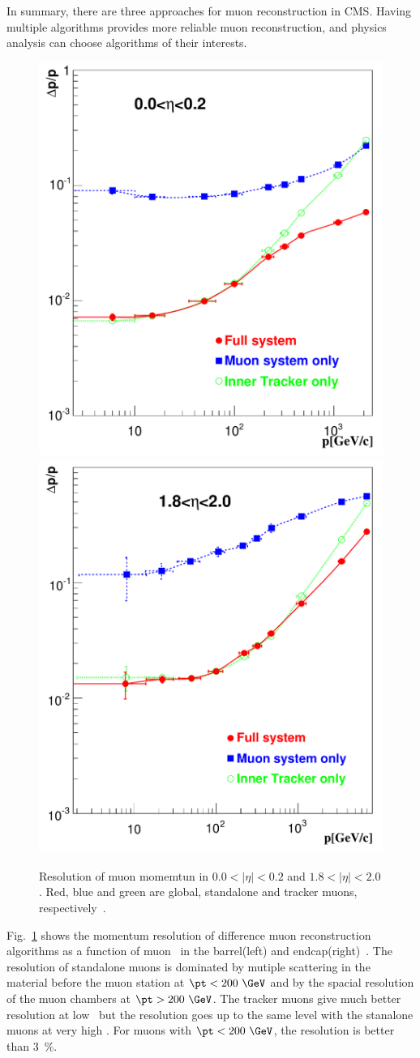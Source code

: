 In summary, there are three approaches for muon reconstruction in CMS. 
Having multiple algorithms provides more reliable muon reconstruction, 
and physics analysis can choose algorithms of their interests. 
\begin{figure}[!hbtp]
\centering
\includegraphics[width=.45\textwidth]{figures/Figure_001-005-a.pdf}
\includegraphics[width=.45\textwidth]{figures/Figure_001-005-b.pdf}
\caption{Resolution of muon momemtun in $0.0<|\eta|<0.2$ and $1.8<|\eta|<2.0$. 
Red, blue and green are global, standalone and tracker muons, 
respectively~\cite{cmstdr1}.} 
\label{fig:muon_res}
\end{figure}
Fig.~\ref{fig:muon_res} shows the momentum resolution of difference muon 
reconstruction algorithms as a function of muon \pt\ 
in the barrel(left) and endcap(right)~\cite{cmstdr1}. 
The resolution of standalone muons is dominated by mutiple scattering in the material 
before the muon station at $\pt<200~\GeV$  and by the spacial resolution 
of the muon chambers at $\pt>200~\GeV$. The tracker muons give much better 
resolution at low \pt\, but the resolution goes up to the same level 
with the stanalone muons at very high \pt. For muons with $\pt<200~\GeV$, 
the resolution is better than 3~\%.


